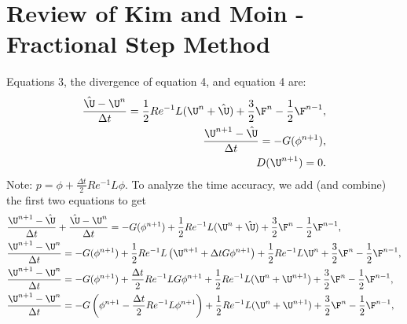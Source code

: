 \documentclass[11pt]{article}
\newcommand{\ReInv}{Re^{-1}}
\begin{document}
\section{Review of Kim and Moin - Fractional Step Method}
Equations 3, the divergence of equation 4, and equation 4 are:
\begin{equation}\begin{aligned} \label{eq:TD_FSM_KM}
\frac{\hat{\U}-\U^n}{\Delta t} = \frac{1}{2} \ReInv L(\U^n+\hat{\U}) + \frac{3}{2}\F^n - \frac{1}{2}\F^{n-1}, \\
\frac{\U^{n+1}-\hat{\U}}{\Delta t} =  - G (\phi^{n+1}), \\
D(\U^{n+1}) = 0.
\end{aligned} \end{equation}
Note: $p = \phi + \frac{\Delta t}{2} \ReInv L \phi$. To analyze the time accuracy, we add (and combine) the first two equations to get
\begin{equation}\begin{aligned}
& \frac{\U^{n+1}-\hat{\U}}{\Delta t} + \frac{\hat{\U}-\U^n}{\Delta t} = - G (\phi^{n+1}) + \frac{1}{2} \ReInv L(\U^n+\hat{\U}) + \frac{3}{2}\F^n - \frac{1}{2}\F^{n-1}, \\
& \frac{\U^{n+1}-\U^n}{\Delta t} = - G (\phi^{n+1}) + \frac{1}{2} \ReInv L\left(\U^{n+1}+ \Delta t G\phi^{n+1} \right) + \frac{1}{2} \ReInv L\U^n + \frac{3}{2}\F^n - \frac{1}{2}\F^{n-1}, \\
& \frac{\U^{n+1}-\U^n}{\Delta t} = - G (\phi^{n+1}) + \frac{\Delta t}{2} \ReInv L G\phi^{n+1} + \frac{1}{2} \ReInv L(\U^n+\U^{n+1}) + \frac{3}{2}\F^n - \frac{1}{2}\F^{n-1}, \\
& \frac{\U^{n+1}-\U^n}{\Delta t} = - G \left(\phi^{n+1} - \frac{\Delta t}{2} \ReInv L \phi^{n+1} \right) + \frac{1}{2} \ReInv L(\U^n+\U^{n+1}) + \frac{3}{2}\F^n - \frac{1}{2}\F^{n-1}, \\
\end{aligned} \end{equation}
\end{document}
